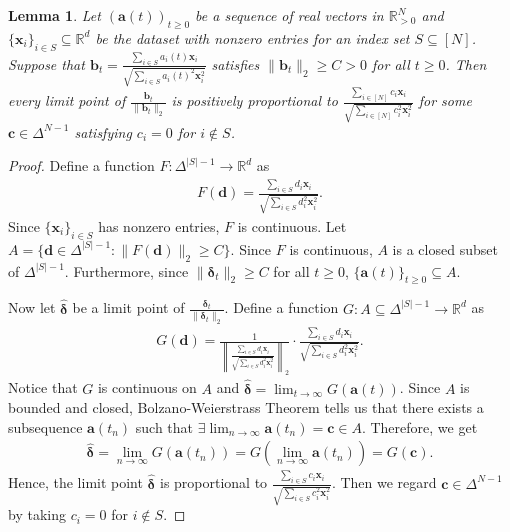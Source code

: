 \documentclass{article} %
\theoremstyle{plain}
\newtheorem{lemma}[theorem]{Lemma}
\theoremstyle{definition}
\theoremstyle{remark}
\def\bignorm#1{\left\lVert#1\right\rVert}
\newcommand{\R}{\mathbb{R}}
\def\ba{{\boldsymbol a}}
\def\bdel{{\boldsymbol \delta}}
\def\bx{{\mathbf x}}
\def\bb{{\mathbf b}}
\def\bc{{\mathbf c}}
\def\bd{{\mathbf d}}
\begin{document}
\begin{lemma} \label{lemma:limit_point}
    Let $(\ba(t))_{t \geq 0}$ be a sequence of real vectors in $\R_{>0}^N$ and $\{\bx_i\}_{i \in S} \subseteq \R^d$ be the dataset with nonzero entries for an index set $S \subseteq [N]$. Suppose that $\bb_t=\frac{\sum_{i \in S}a_i(t)\bx_i}{\sqrt{\sum_{i\in S}a_i(t)^2 \bx_i^2}}$ satisfies $\|\bb_t\|_2 \geq C>0$ for all $t\geq0$. Then every limit point of $\frac{\bb_t}{\|\bb_t\|_2}$ is positively proportional to $\frac{\sum_{i \in [N]}c_i\bx_i}{\sqrt{\sum_{i\in[N]}c_i^2 \bx_i^2}}$ for some $\bc \in \Delta^{N-1}$ satisfying $c_i=0$ for $i\notin S$.
\end{lemma}
\begin{proof}
    Define a function $F:\Delta^{|S|-1} \rightarrow \R^d$ as
    \begin{align*}
        F(\bd) = \frac{\sum_{i \in S}d_i\bx_i}{\sqrt{\sum_{i\in S}d_i^2 \bx_i^2}}.
    \end{align*}
    Since $\{\bx_i\}_{i \in S}$ has nonzero entries, $F$ is continuous. Let $A = \{\bd \in \Delta^{|S|-1}: \|F(\bd)\|_2 \geq C\}$. Since $F$ is continuous, $A$ is a closed subset of $\Delta^{|S|-1}$. Furthermore, since $\|\bdel_t\|_2 \geq C$ for all $t \geq 0$, $\{\ba(t)\}_{t \geq 0} \subseteq A$. 

    Now let $\hat{\bdel}$ be a limit point of $\frac{\bdel_t}{\|\bdel_t\|_2}$. Define a function $G:A \subseteq \Delta^{|S|-1} \rightarrow \R^d$ as
    \begin{align*}
        G(\bd) = \frac{1}{\bignorm{\frac{\sum_{i \in S}d_i\bx_i}{\sqrt{\sum_{i\in S}d_i^2 \bx_i^2}}}_2} \cdot \frac{\sum_{i \in S}d_i\bx_i}{\sqrt{\sum_{i\in S}d_i^2 \bx_i^2}}.
    \end{align*}
    Notice that $G$ is continuous on $A$ and $\hat{\bdel} = \lim_{t \rightarrow \infty}G(\ba(t))$. Since $A$ is bounded and closed, Bolzano-Weierstrass Theorem tells us that there exists a subsequence $\ba(t_n)$ such that $\exists \lim_{n \rightarrow \infty} \ba(t_n) = \bc \in A$. Therefore, we get
    \begin{align*}
        \hat{\bdel} = \lim_{n \rightarrow \infty}G(\ba(t_n)) = G(\lim_{n \rightarrow \infty} \ba(t_n)) = G(\bc).
    \end{align*}
    Hence, the limit point $\hat{\bdel}$ is proportional to $\frac{\sum_{i \in S}c_i\bx_i}{\sqrt{\sum_{i\in S}c_i^2 \bx_i^2}}$. Then we regard $\bc \in \Delta^{N-1}$ by taking $c_i=0$ for $i \notin S$.
\end{proof}
\end{document}
